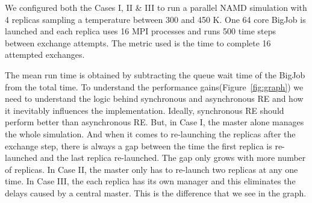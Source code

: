 \documentclass[a4paper,10pt]{article}
\begin{document}
We configured both the Cases I, II \& III to run a parallel NAMD simulation with 4 replicas sampling a temperature between 300 and 450 K. One 64 core BigJob is launched and each replica uses 16 MPI processes and runs 500 time steps between exchange attempts. The metric used is the time to complete 16 attempted exchanges. %


The mean run time is obtained by subtracting the queue wait time of the BigJob from the total time. To understand the performance gains(Figure~\ref{fig:graph}) we need to understand the logic behind synchronous and asynchronous RE and how it inevitably influences the implementation. Ideally, synchronous RE should perform better than asynchronous RE. But, in Case I, the master alone manages the whole simulation. And when it comes to re-launching the replicas after the exchange step, there is always a gap between the time the first replica is re-launched and the last replica re-launched. The gap only grows with more number of replicas. In Case II, the master only has to re-launch two replicas at any one time. In Case III, the each replica has its own manager and this eliminates the delays caused by a central master. This is the difference that we see in the graph. 
\end{document}
